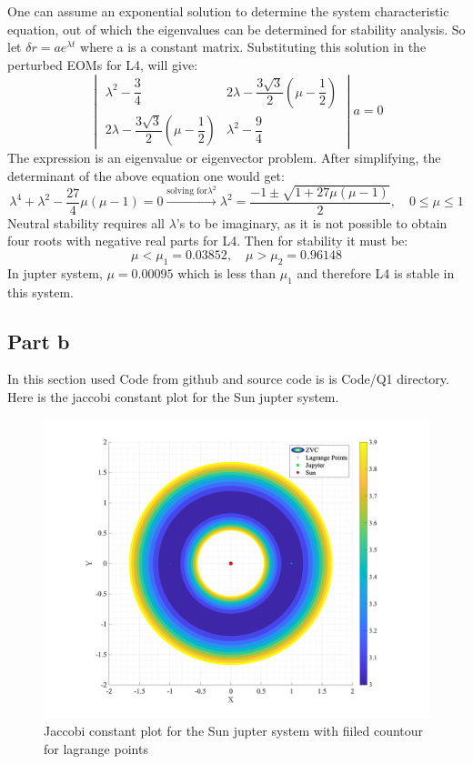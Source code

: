 One can assume an exponential solution to determine the system characteristic equation, out of which the eigenvalues can be determined for stability analysis. So let $\delta r =  ae^{\lambda t}$ where a
is a constant matrix. Substituting this solution in the perturbed EOMs for L4, will give:
\begin{equation}
    \begin{vmatrix}
        \lambda^2 - \dfrac{3}{4} & 2\lambda - \dfrac{3\sqrt{3}}{2}\left(\mu-\dfrac{1}{2}\right)\\
        2\lambda - \dfrac{3\sqrt{3}}{2}\left(\mu-\dfrac{1}{2}\right) & \lambda^2 - \dfrac{9}{4}
    \end{vmatrix}a = 0
\end{equation}
The expression is an eigenvalue or eigenvector problem.
After simplifying, the determinant of the above equation one would get:
\begin{equation}
    \lambda^4 + \lambda^2 - \dfrac{27}{4}\mu(\mu-1) = 0\xrightarrow{\text{solving for} \lambda^2}\lambda^2 = \dfrac{-1\pm\sqrt{1+27\mu(\mu-1)}}{2}, \quad 0 \leq \mu \leq 1
\end{equation}
Neutral stability requires all $\lambda$'s to be imaginary, as it is not possible to obtain four roots with negative real parts for L4. Then for stability it must be:
\begin{equation}
    \mu < \mu_1 = 0.03852, \quad \mu > \mu_2 = 0.96148
\end{equation}
In jupter system, $\mu = 0.00095$ which is less than $\mu_1$ and therefore L4 is stable in this system.
\subsection{Part b}
In this section used Code from github and source code is is Code/Q1 directory. Here is the jaccobi constant plot for the Sun jupter system.
\begin{figure}[H]
    \centering
    \includegraphics[width=\textwidth]{../Figure/Q1/jaccobi_1}
    \caption{Jaccobi constant plot for the Sun jupter system with fiiled countour for lagrange points}
    \label{fig:my_label}
\end{figure}

